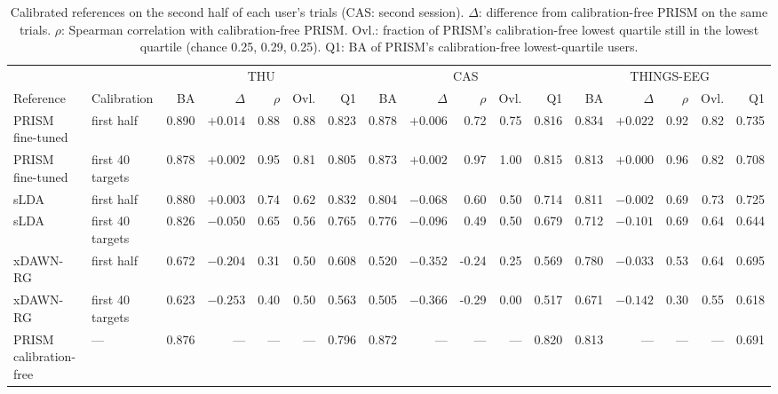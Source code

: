 \begin{table}[H]
\centering
\caption{Calibrated references on the second half of each user's trials (CAS: second session). $\Delta$: difference from calibration-free PRISM on the same trials. $\rho$: Spearman correlation with calibration-free PRISM. Ovl.: fraction of PRISM's calibration-free lowest quartile still in the lowest quartile (chance 0.25, 0.29, 0.25). Q1: BA of PRISM's calibration-free lowest-quartile users.}
\label{tab:supp-calibration}
\tiny
\begin{adjustbox}{max width=\textwidth}
\begin{tabular}{@{}llrrrrrrrrrrrrrrr@{}}
\toprule
& & \multicolumn{5}{c}{THU} & \multicolumn{5}{c}{CAS} & \multicolumn{5}{c}{THINGS-EEG} \\
\cmidrule(lr){3-7}\cmidrule(lr){8-12}\cmidrule(lr){13-17}
Reference & Calibration & BA & $\Delta$ & $\rho$ & Ovl. & Q1 & BA & $\Delta$ & $\rho$ & Ovl. & Q1 & BA & $\Delta$ & $\rho$ & Ovl. & Q1 \\
\midrule
PRISM fine-tuned & first half & 0.890 & $+0.014$ & 0.88 & 0.88 & 0.823 & 0.878 & $+0.006$ & 0.72 & 0.75 & 0.816 & 0.834 & $+0.022$ & 0.92 & 0.82 & 0.735 \\
PRISM fine-tuned & first 40 targets & 0.878 & $+0.002$ & 0.95 & 0.81 & 0.805 & 0.873 & $+0.002$ & 0.97 & 1.00 & 0.815 & 0.813 & $+0.000$ & 0.96 & 0.82 & 0.708 \\
\midrule
sLDA & first half & 0.880 & $+0.003$ & 0.74 & 0.62 & 0.832 & 0.804 & $-0.068$ & 0.60 & 0.50 & 0.714 & 0.811 & $-0.002$ & 0.69 & 0.73 & 0.725 \\
sLDA & first 40 targets & 0.826 & $-0.050$ & 0.65 & 0.56 & 0.765 & 0.776 & $-0.096$ & 0.49 & 0.50 & 0.679 & 0.712 & $-0.101$ & 0.69 & 0.64 & 0.644 \\
\midrule
xDAWN-RG & first half & 0.672 & $-0.204$ & 0.31 & 0.50 & 0.608 & 0.520 & $-0.352$ & -0.24 & 0.25 & 0.569 & 0.780 & $-0.033$ & 0.53 & 0.64 & 0.695 \\
xDAWN-RG & first 40 targets & 0.623 & $-0.253$ & 0.40 & 0.50 & 0.563 & 0.505 & $-0.366$ & -0.29 & 0.00 & 0.517 & 0.671 & $-0.142$ & 0.30 & 0.55 & 0.618 \\
\midrule
PRISM calibration-free & --- & 0.876 & --- & --- & --- & 0.796 & 0.872 & --- & --- & --- & 0.820 & 0.813 & --- & --- & --- & 0.691 \\
\bottomrule
\end{tabular}
\end{adjustbox}
\end{table}
